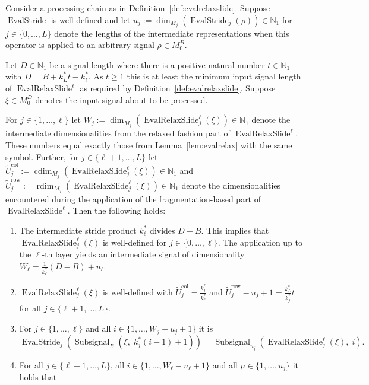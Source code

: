 \documentclass[journal]{IEEEtran}
\newcommand{\N}{\mathbb{N}}
\newcommand{\ROI}{B}
\newcommand{\discint}[2]{\{#1,\dotsc,#2\}}
\newcommand{\inint}[2]{\in\discint{#1}{#2}}
\DeclareMathOperator{\rdim}{rdim}
\DeclareMathOperator{\cdim}{cdim}
\DeclareMathOperator{\Subsignal}{Subsignal}
\DeclareMathOperator{\EvalStride}{EvalStride}
\newcommand{\row}{\operatorname{row}}
\newcommand{\col}{\operatorname{col}}
\DeclareMathOperator{\EvalRelaxSlide}{EvalRelaxSlide}
\begin{document}
\begin{lemma}
\label{lem:evalrelaxslide}
Consider a processing chain as in Definition~\ref{def:evalrelaxslide}.
Suppose $\EvalStride$ is well-defined and let $u_j := \dim_{M_j}(\EvalStride_j(\rho))\in\N_1$ for $j\inint{0}{L}$ denote the lengths of the intermediate representations when this operator is applied to an arbitrary signal $\rho\in M_0^\ROI$.

Let $D\in\N_1$ be a signal length where there is a positive natural number $t\in\N_1$ with $D = \ROI + k_L^*t - k_\ell^*$.
As $t \geq 1$ this is at least the minimum input signal length of $\EvalRelaxSlide^\ell$ as required by Definition~\ref{def:evalrelaxslide}.
Suppose $\xi\in M_0^D$ denotes the input signal about to be processed.

For $j\inint{1}{\ell}$ let $W_j := \dim_{M_j}(\EvalRelaxSlide_j^\ell(\xi))\in\N_1$ denote the intermediate dimensionalities from the relaxed fashion part of $\EvalRelaxSlide^\ell$.
These numbers equal exactly those from Lemma~\ref{lem:evalrelax} with the same symbol.
Further, for $j\inint{\ell + 1}{L}$ let $\tilde{U}_j^{\col} := \cdim_{M_j}(\EvalRelaxSlide_j^\ell(\xi))\in\N_1$ and $\tilde{U}_j^{\row} := \rdim_{M_j}(\EvalRelaxSlide_j^\ell(\xi))\in\N_1$ denote the dimensionalities encountered during the application of the fragmentation-based part of $\EvalRelaxSlide^\ell$.
Then the following holds:
\begin{enumerate}
  \item \label{lem:evalrelaxslide-a} The intermediate stride product $k_\ell^*$ divides $D - \ROI$.
        This implies that $\EvalRelaxSlide_j^\ell(\xi)$ is well-defined for $j\inint{0}{\ell}$.
        The application up to the $\ell$-th layer yields an intermediate signal of dimensionality $W_\ell = \frac{1}{k_\ell^*}(D - \ROI) + u_\ell$.
  \item \label{lem:evalrelaxslide-b} $\EvalRelaxSlide_j^\ell(\xi)$ is well-defined with $\tilde{U}_j^{\col} = \frac{k_j^*}{k_\ell^*}$ and $\tilde{U}_j^{\row} - u_j + 1 = \frac{k_L^*}{k_j^*}t$ for all $j\inint{\ell + 1}{L}$.
  \item \label{lem:evalrelaxslide-c} For $j\inint{1}{\ell}$ and all $i\inint{1}{W_j - u_j + 1}$ it is
        \begin{displaymath}
          \EvalStride_j(\Subsignal_\ROI(\xi,\; k_j^*(i - 1) + 1))
          = \Subsignal_{u_j}(\EvalRelaxSlide_j^\ell(\xi),\; i)\text{.}
        \end{displaymath}
  \item \label{lem:evalrelaxslide-d} For all $j\inint{\ell + 1}{L}$, all $i\inint{1}{W_\ell - u_\ell + 1}$ and all $\mu\inint{1}{u_j}$ it holds that

\end{enumerate}
\end{lemma}
\end{document}
